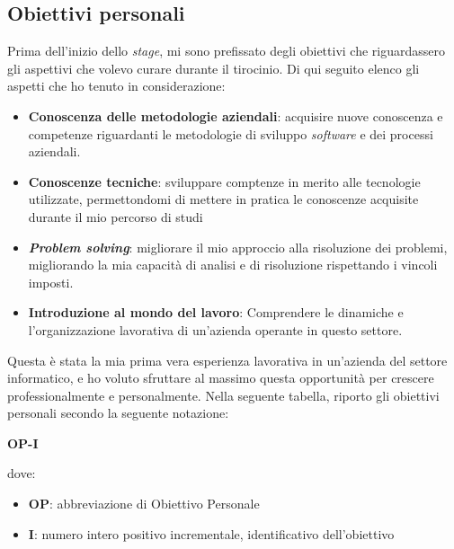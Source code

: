 \subsection{Obiettivi personali}
Prima dell'inizio dello \textit{stage}, mi sono prefissato degli obiettivi che riguardassero gli aspettivi che volevo curare durante il tirocinio. Di qui seguito elenco gli aspetti che ho tenuto in considerazione:
\begin{itemize}
    \item \textbf{Conoscenza delle metodologie aziendali}: acquisire nuove conoscenza e competenze riguardanti le metodologie di sviluppo \textit{software} e dei processi aziendali. 
    \item \textbf{Conoscenze tecniche}: sviluppare comptenze in merito alle tecnologie utilizzate, permettondomi di mettere in pratica le conoscenze acquisite durante il mio percorso di studi
    \item \textbf{\textit{Problem solving}}: migliorare il mio approccio alla risoluzione dei problemi, migliorando la mia capacità di analisi e di risoluzione rispettando i vincoli imposti.
    \item \textbf{Introduzione al mondo del lavoro}: Comprendere le dinamiche e l'organizzazione lavorativa di un'azienda operante in questo settore.
\end{itemize}
Questa è stata la mia prima vera esperienza lavorativa in un'azienda del settore informatico, e ho voluto sfruttare al massimo questa opportunità per crescere professionalmente e personalmente.
Nella seguente tabella, riporto gli obiettivi personali secondo la seguente notazione:
\begin{center}
    \textbf{OP-I}
\end{center}
dove:
\begin{itemize}
    \item \textbf{OP}: abbreviazione di Obiettivo Personale
    \item \textbf{I}: numero intero positivo incrementale, identificativo dell'obiettivo
\end{itemize}


